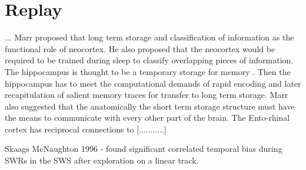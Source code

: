 \section{Replay}
\label{replay}
...
Marr \cite{Marr2007} proposed that long term storage and classification of information as the functional role of neocortex. He also proposed that the neocortex would be required to be trained during sleep to classify overlapping pieces of information. The hippocampus is thought to be a temporary storage for memory \cite{Buzsaki1989, Battaglia2011}. Then the hippocampus has to meet the computational demands of rapid encoding and later recapitulation of salient memory traces for transfer to long term storage. Marr also suggested that the anatomically the short term storage structure must have the means to communicate with every other part of the brain. The Ento-rhinal cortex has reciprocal connections to [...........]

Skaags McNaughton 1996 - found significant correlated temporal bias during SWRs in the SWS after exploration on a linear track.\\



